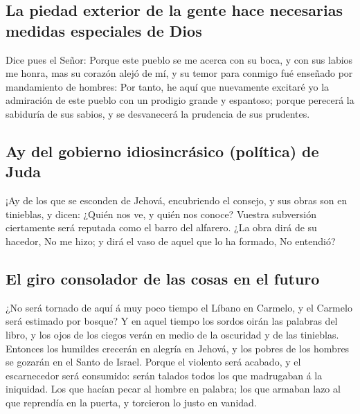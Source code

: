 \hypertarget{la-piedad-exterior-de-la-gente-hace-necesarias-medidas-especiales-de-dios}{%
\subsection{La piedad exterior de la gente hace necesarias medidas
especiales de
Dios}\label{la-piedad-exterior-de-la-gente-hace-necesarias-medidas-especiales-de-dios}}

 Dice pues el Señor: Porque este pueblo se me acerca con su
boca, y con sus labios me honra, mas su corazón alejó de mí, y su temor
para conmigo fué enseñado por mandamiento de hombres:  Por
tanto, he aquí que nuevamente excitaré yo la admiración de este pueblo
con un prodigio grande y espantoso; porque perecerá la sabiduría de sus
sabios, y se desvanecerá la prudencia de sus prudentes.

\hypertarget{ay-del-gobierno-idiosincruxe1sico-poluxedtica-de-juda}{%
\subsection{Ay del gobierno idiosincrásico (política) de
Juda}\label{ay-del-gobierno-idiosincruxe1sico-poluxedtica-de-juda}}

 ¡Ay de los que se esconden de Jehová, encubriendo el
consejo, y sus obras son en tinieblas, y dicen: ¿Quién nos ve, y quién
nos conoce?  Vuestra subversión ciertamente será reputada
como el barro del alfarero. ¿La obra dirá de su hacedor, No me hizo; y
dirá el vaso de aquel que lo ha formado, No entendió?

\hypertarget{el-giro-consolador-de-las-cosas-en-el-futuro}{%
\subsection{El giro consolador de las cosas en el
futuro}\label{el-giro-consolador-de-las-cosas-en-el-futuro}}

 ¿No será tornado de aquí á muy poco tiempo el Líbano en
Carmelo, y el Carmelo será estimado por bosque?  Y en aquel
tiempo los sordos oirán las palabras del libro, y los ojos de los ciegos
verán en medio de la oscuridad y de las tinieblas. 
Entonces los humildes crecerán en alegría en Jehová, y los pobres de los
hombres se gozarán en el Santo de Israel.  Porque el
violento será acabado, y el escarnecedor será consumido: serán talados
todos los que madrugaban á la iniquidad.  Los que hacían
pecar al hombre en palabra; los que armaban lazo al que reprendía en la
puerta, y torcieron lo justo en vanidad.

